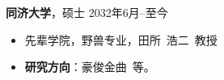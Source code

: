 \documentclass[11pt]{article}
\begin{document}
\begin{minipage}[t]{0.78\textwidth}
\begin{minipage}[t]{\textwidth}
        \vspace{0.5em}
        {\large \textbf{同济大学}}，硕士 \hfill 2032年6月--至今
        \begin{itemize}
            \item 先辈学院，野兽专业，田所\ 浩二\ 教授
            \item \textbf{研究方向}：豪俊金曲\ 等。
        \end{itemize}
        
        \vspace{1.2em}
        \end{minipage}
    \end{minipage}
    \hfill
    \begin{minipage}[t]{0.2\textwidth}
        \vspace{2em} %
        \setlength{\fboxsep}{0pt}
    \end{minipage}
\end{document}

